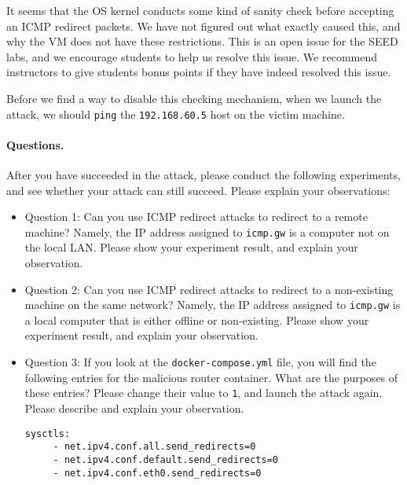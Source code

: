 It seems that the OS kernel conducts some kind of 
sanity check before accepting an ICMP redirect packets. 
We have not figured out what exactly caused this, 
and why the VM does not have these restrictions. 
This is an open issue for the SEED labs, and we encourage 
students to help us resolve this issue. We recommend instructors
to give students bonus points if they have indeed resolved this issue. 


Before we find a way to disable this checking mechanism, 
when we launch the attack,
we should \texttt{ping} the \texttt{192.168.60.5} host on the 
victim machine. 


\paragraph{Questions.} After you have succeeded in the attack, please 
conduct the following experiments, and see whether your attack can 
still succeed. Please explain your observations:

\begin{itemize}
\item Question 1: Can you use ICMP redirect attacks to redirect to a remote machine? Namely,
the IP address assigned to \texttt{icmp.gw} is a computer not on the local LAN. 
Please show your experiment result, and explain your observation.  

\item Question 2: Can you use ICMP redirect attacks to redirect to a non-existing machine on
the same network? Namely, the IP address assigned to \texttt{icmp.gw} is a local computer that
is either offline or non-existing. 
Please show your experiment result, and explain your observation.  

\item Question 3: If you look at the \texttt{docker-compose.yml} file, you will find the 
following entries for the malicious router container. What are the purposes
of these entries? Please change their value to \texttt{1}, and launch the attack again. 
Please describe and explain your observation. 

\begin{lstlisting}
sysctls:
     - net.ipv4.conf.all.send_redirects=0
     - net.ipv4.conf.default.send_redirects=0
     - net.ipv4.conf.eth0.send_redirects=0
\end{lstlisting}
 
\end{itemize}






